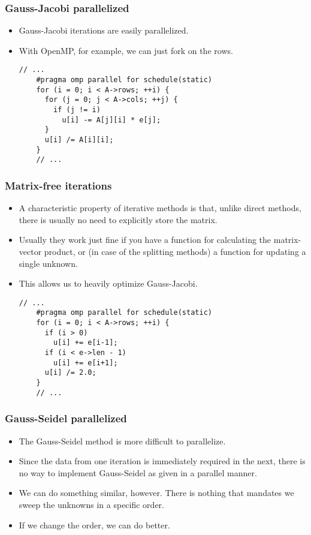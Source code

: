 \begin{frame}[fragile]
  \frametitle{Gauss-Jacobi parallelized}
  \begin{itemize}
  \item Gauss-Jacobi iterations are easily parallelized.
  \item With OpenMP, for example, we can just fork on the rows.
\begin{lstlisting}[style=c, basicstyle=\ttfamily\footnotesize]
    // ...
    #pragma omp parallel for schedule(static)
    for (i = 0; i < A->rows; ++i) {
      for (j = 0; j < A->cols; ++j) {
        if (j != i)
          u[i] -= A[j][i] * e[j];
      }
      u[i] /= A[i][i];
    }
    // ...
\end{lstlisting}
  \end{itemize}
\end{frame}

\begin{frame}[fragile]
  \frametitle{Matrix-free iterations}
  \begin{itemize}
  \item A characteristic property of iterative methods is that, unlike direct
    methods, there is usually no need to explicitly store the matrix.
  \item Usually they work just fine if you have a function for calculating the
    matrix-vector product, or (in case of the splitting methods) a function for
    updating a single unknown.
  \item This allows us to heavily optimize Gauss-Jacobi.
\begin{lstlisting}[style=c, basicstyle=\ttfamily\footnotesize]
    // ...
    #pragma omp parallel for schedule(static)
    for (i = 0; i < A->rows; ++i) {
      if (i > 0)
        u[i] += e[i-1];
      if (i < e->len - 1)
        u[i] += e[i+1];
      u[i] /= 2.0;
    }
    // ...
\end{lstlisting}
  \end{itemize}
\end{frame}

\begin{frame}
  \frametitle{Gauss-Seidel parallelized}
  \begin{itemize}
  \item The Gauss-Seidel method is more difficult to parallelize.
  \item Since the data from one iteration is immediately required in the next,
    there is no way to implement Gauss-Seidel as given in a parallel manner.
  \item We can do something similar, however. There is nothing that mandates we
    sweep the unknowns in a specific order.
  \item If we change the order, we can do better.
  \end{itemize}
\end{frame}

